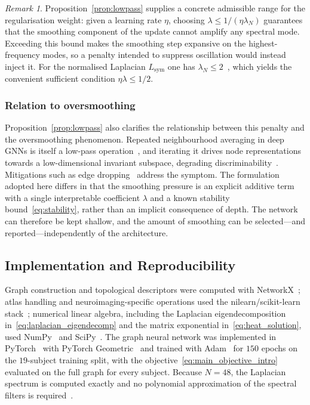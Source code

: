 \documentclass[11pt,reqno]{amsart}
\theoremstyle{plain}
\theoremstyle{definition}
\theoremstyle{remark}
\newtheorem{remark}[theorem]{Remark}
\numberwithin{equation}{section}
\newcommand{\Lsym}{L_{\mathrm{sym}}}
\begin{document}
\begin{remark}
Proposition~\ref{prop:lowpass} supplies a concrete admissible range for the
regularisation weight: given a learning rate $\eta$, choosing
$\lambda \le 1/(\eta\lambda_N)$ guarantees that the smoothing component of the
update cannot amplify any spectral mode. Exceeding this bound makes the
smoothing step expansive on the highest-frequency modes, so a penalty intended
to suppress oscillation would instead inject it. For the normalised Laplacian
$\Lsym$ one has $\lambda_N\le 2$~\cite{chung1997spectral}, which yields the
convenient sufficient condition $\eta\lambda\le 1/2$.
\end{remark}

\subsubsection{Relation to oversmoothing}
\label{sec:oversmoothing}

Proposition~\ref{prop:lowpass} also clarifies the relationship between this
penalty and the oversmoothing phenomenon. Repeated neighbourhood averaging in
deep GNNs is itself a low-pass operation~\cite{nt2019revisiting,
balcilar2021analyzing}, and iterating it drives node representations towards a
low-dimensional invariant subspace, degrading
discriminability~\cite{li2018deeper,oono2020graph}. Mitigations such as edge
dropping~\cite{rong2020dropedge} address the symptom. The formulation adopted
here differs in that the smoothing pressure is an explicit additive term with a
single interpretable coefficient $\lambda$ and a known stability
bound~\eqref{eq:stability}, rather than an implicit consequence of depth. The
network can therefore be kept shallow, and the amount of smoothing can be
selected---and reported---independently of the architecture.

\subsection{Implementation and Reproducibility}
\label{sec:implementation}

Graph construction and topological descriptors were computed with
NetworkX~\cite{hagberg2008exploring}; atlas handling and
neuroimaging-specific operations used the nilearn/scikit-learn
stack~\cite{abraham2014machine}; numerical linear algebra, including the
Laplacian eigendecomposition in~\eqref{eq:laplacian_eigendecomp} and the matrix
exponential in~\eqref{eq:heat_solution}, used
NumPy~\cite{harris2020array} and SciPy~\cite{virtanen2020scipy}. The graph
neural network was implemented in PyTorch~\cite{paszke2019pytorch} with PyTorch
Geometric~\cite{fey2019fast} and trained with
Adam~\cite{kingma2015adam} for $150$ epochs on the $19$-subject training split,
with the objective~\eqref{eq:main_objective_intro} evaluated on the full graph
for every subject. Because $N=48$, the Laplacian spectrum is computed exactly
and no polynomial approximation of the spectral filters is
required~\cite{defferrard2016convolutional}.
\end{document}
